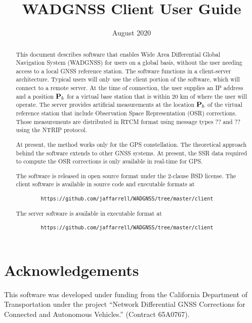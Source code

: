 



\title{WADGNSS Client User Guide}
\date{August 2020}


	\maketitle


\tableofcontents


\begin{abstract}
	This document describes software that enables Wide Area Differential Global Navigation System (WADGNSS) for users on a global basis, without the user needing access to a local GNSS reference station.
	The software functions in a client-server architecture. 
	Typical users will only use the client portion of the software, which will connect to a remote server. 
	At the time of connection, the user supplies an IP address and a position $\mathbf{P}_b$ for a virtual base station that is within 20 km of where the user will operate.
	The server provides artificial measurements at the location $\mathbf{P}_b$ of the virtual reference station that include Observation Space Representation (OSR) corrections. 
	Those measurements are distributed in RTCM format using message types \red ?? and ?? \black using the NTRIP protocol. 
	
	At present, the method works only for the GPS constellation. 
	The theoretical approach behind the software extends to other GNSS systems.
	At present, the SSR data required to compute the OSR corrections is only available in real-time for GPS.  
	
	
	The software is released in open source format under the 2-clause BSD license.
	The client software is available in source code and executable formats at 
	\begin{verbatim}
 		https://github.com/jaffarrell/WADGNSS/tree/master/client 
	\end{verbatim}
	The server software is available in executable format at 
	\begin{verbatim}
 		https://github.com/jaffarrell/WADGNSS/tree/master/client
 	\end{verbatim}
\end{abstract}

\vfill
\section*{Acknowledgements}
This software was developed under funding from the California Department of Transportation under the project ``Network Differential GNSS Corrections for Connected and Autonomous Vehicles.'' (Contract 65A0767).

